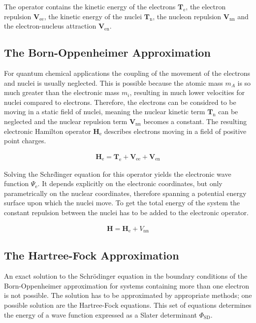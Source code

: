 The operator contains the kinetic energy of the electrons
$\mathbf{T}_\text{e}$, the electron repulsion $\mathbf{V}_\text{ee}$, the
kinetic energy of the nuclei $\mathbf{T}_\text{n}$, the nucleon repulsion
$\mathbf{V}_\text{nn}$ and the electron-nucleus attraction
$\mathbf{V}_\text{en}$.

\subsection{The Born-Oppenheimer Approximation}
\label{sec:bornoppenheimerapproximation}

For quantum chemical applications the coupling of the movement of the electrons
and nuclei is usually neglected. This is possible because the atomic mass $m_A$
is so much greater than the electronic mass $m_i$, resulting in much lower
velocities for nuclei compared to electrons. Therefore, the electrons can be
considred to be moving in a static field of nuclei, meaning the nuclear kinetic
term $\mathbf{T}_\text{n}$ can be neglected and the nuclear repulsion term
$\mathbf{V}_\text{nn}$ becomes a constant. The resulting electronic Hamilton
operator $\mathbf{H}_\text{e}$ describes electrons moving in a field of
positive point charges.

\begin{align}
    \mathbf{H}_\text{e}=\mathbf{T}_\text{e} + \mathbf{V}_\text{ee} + \mathbf{V}_\text{en}
\end{align}

Solving the Schr\"dinger equation for this operator yields the electronic wave
function $\Psi_\text{e}$. It depends explicitly on the electronic coordinates,
but only parametrically on the nuclear coordinates, therefore spanning a
potential energy surface upon which the nuclei move. To get the total energy of
the system the constant repulsion between the nuclei has to be added to the
electronic operator.

\begin{align}
    \mathbf{H}=\mathbf{H}_\text{e}+V_\text{nn}\label{eqn:hamiltonoperatorfinal}
\end{align}

\subsection{The Hartree-Fock Approximation}
\label{sec:hartreefockapproximation}

An exact solution to the Schr\"odinger equation in the boundary conditions of
the Born-Oppenheimer approximation for systems containing more than one
electron is not possible. The solution has to be approximated by appropriate
methods; one possible solution are the Hartree-Fock equations. This set of
equations determines the energy of a wave function expressed as a Slater
determinant $\Phi_\text{SD}$.

